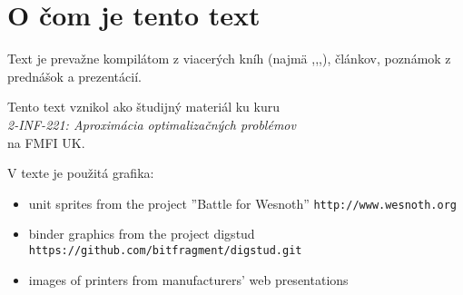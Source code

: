 \section*{O čom je tento text}

\noindent
Text je prevažne kompilátom z viacerých kníh (najmä \cite{GLS88},\cite{MG07},\cite{V04},\cite{WS11}),
článkov, poznámok z prednášok a prezentácií.


\vfill\noindent
Tento text vznikol ako študijný materiál ku kuru\\
{\em 2-INF-221: Aproximácia optimalizačných problémov} \\
na FMFI UK.


V texte je použitá grafika: \\
\begin{itemize}
  \item unit sprites from the project ''Battle for Wesnoth'' {\tt http://www.wesnoth.org}
  \item binder graphics from the project digstud {\tt https://github.com/bitfragment/digstud.git}
  \item images of printers from manufacturers' web presentations
\end{itemize}

